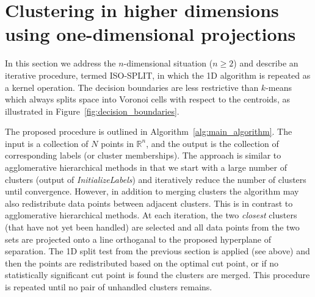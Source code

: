 \documentclass[10pt]{article}
\begin{document}
\section {Clustering in higher dimensions using one-dimensional projections}

\label{isosplit-algorithm}

In this section we address the $n$-dimensional situation ($n\geq2$) and describe an iterative procedure, termed ISO-SPLIT, in which the 1D algorithm is repeated as a kernel operation. The decision boundaries are less restrictive than $k$-means which always splits space into Voronoi cells with respect to the centroids, as illustrated in Figure~\ref{fig:decision_boundaries}.

The proposed procedure is outlined in Algorithm~\ref{alg:main_algorithm}. The input is a collection of $N$ points in $\mathbb{R}^n$, and the output is the collection of corresponding labels (or cluster memberships). The approach is similar to agglomerative hierarchical methods in that we start with a large number of clusters (output of \emph{InitializeLabels}) and iteratively reduce the number of clusters until convergence. However, in addition to merging clusters the algorithm may also redistribute data points between adjacent clusters. This is in contrast to agglomerative hierarchical methods. At each iteration, the two \emph{closest} clusters (that have not yet been handled) are selected and all data points from the two sets are projected onto a line orthoganal to the proposed hyperplane of separation. The 1D split test from the previous section is applied (see above) and then the points are redistributed based on the optimal cut point, or if no statistically significant cut point is found the clusters are merged. This procedure is repeated until no pair of unhandled clusters remains.
\end{document}
